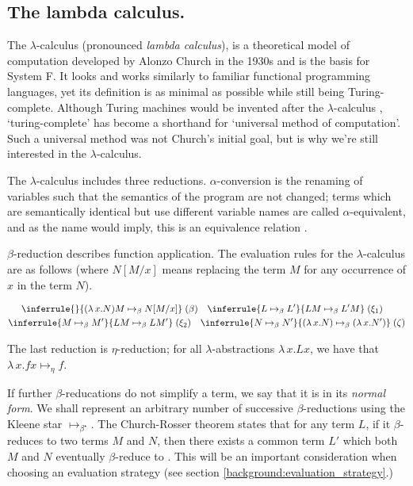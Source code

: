 \subsection{The lambda calculus.}
The $\lambda$-calculus (pronounced \textit{lambda calculus}), is a theoretical model of computation
developed by Alonzo Church in the 1930s \citep{church_set_1932} and is the basis for System F. It
looks and works similarly to familiar functional programming languages, yet its definition is as
minimal as possible while still being Turing-complete. Although Turing machines would be invented
after the $\lambda$-calculus \citep{turing_computable_1937}, `turing-complete' has become a
shorthand for `universal method of computation'. Such a universal method was not Church's initial
goal, but is why we're still interested in the $\lambda$-calculus.

The $\lambda$-calculus includes three reductions. $\alpha$-conversion is the renaming of variables
such that the semantics of the program are not changed; terms which are semantically identical but
use different variable names are called $\alpha$-equivalent, and as the name would imply, this is an
equivalence relation \citep{pierce_types_2002}.

$\beta$-reduction describes function application. The evaluation rules for the $\lambda$-calculus
are as follows \citep{wadler_programming_2022} (where $N[M/x]$ means replacing the term $M$ for any occurrence of $x$ in the term $N$).

\begin{equation}
\label{equation:untyped_beta_rules}
\begin{gathered}
  \inferrule{ }{(\lambda \, x. N)M \mapsto_{\beta} N[M/x]} \; (\beta) \quad
  \inferrule{L \mapsto_{\beta} L'}{LM \mapsto_{\beta} L'M} \; (\xi_1) \quad\\
  \inferrule{M \mapsto_{\beta} M'}{LM \mapsto_{\beta} LM'} \; (\xi_2) \quad
  \inferrule
    {N \mapsto_{\beta} N'}
    {(\lambda \, x. N) \mapsto_{\beta} (\lambda \, x. N')} \; (\zeta)
\end{gathered}
\end{equation}

The last reduction is $\eta$-reduction; for all $\lambda$-abstractions $\lambda \, x. L x$, we have
that $\lambda \, x. f x \mapsto_{\eta} f$.

If further $\beta$-reducations do not simplify a term, we say that it is in its \textit{normal
form}. We shall represent an arbitrary number of successive $\beta$-reductions using the Kleene star
$\mapsto_{\beta^{\star}}$. The Church-Rosser theorem states that for any term $L$, if it
$\beta$-reduces to two terms $M$ and $N$, then there exists a common term $L'$ which both $M$ and
$N$ eventually $\beta$-reduce to \citep{church_properties_1936}. This will be an important
consideration when choosing an evaluation strategy (see section \ref{background:evaluation_strategy}.)

